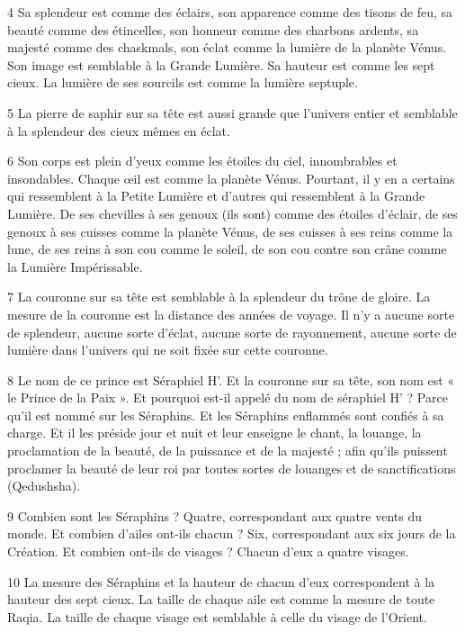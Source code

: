 \par 4 Sa splendeur est comme des éclairs, son apparence comme des tisons de feu, sa beauté comme des étincelles, son honneur comme des charbons ardents, sa majesté comme des chaskmals, son éclat comme la lumière de la planète Vénus. Son image est semblable à la Grande Lumière. Sa hauteur est comme les sept cieux. La lumière de ses sourcils est comme la lumière septuple.

\par 5 La pierre de saphir sur sa tête est aussi grande que l'univers entier et semblable à la splendeur des cieux mêmes en éclat.

\par 6 Son corps est plein d'yeux comme les étoiles du ciel, innombrables et insondables. Chaque œil est comme la planète Vénus. Pourtant, il y en a certains qui ressemblent à la Petite Lumière et d’autres qui ressemblent à la Grande Lumière. De ses chevilles à ses genoux (ils sont) comme des étoiles d'éclair, de ses genoux à ses cuisses comme la planète Vénus, de ses cuisses à ses reins comme la lune, de ses reins à son cou comme le soleil, de son cou contre son crâne comme la Lumière Impérissable.

\par 7 La couronne sur sa tête est semblable à la splendeur du trône de gloire. La mesure de la couronne est la distance des années de voyage. Il n’y a aucune sorte de splendeur, aucune sorte d’éclat, aucune sorte de rayonnement, aucune sorte de lumière dans l’univers qui ne soit fixée sur cette couronne.

\par 8 Le nom de ce prince est Séraphiel H'. Et la couronne sur sa tête, son nom est « le Prince de la Paix ». Et pourquoi est-il appelé du nom de séraphiel H' ? Parce qu'il est nommé sur les Séraphins. Et les Séraphins enflammés sont confiés à sa charge. Et il les préside jour et nuit et leur enseigne le chant, la louange, la proclamation de la beauté, de la puissance et de la majesté ; afin qu'ils puissent proclamer la beauté de leur roi par toutes sortes de louanges et de sanctifications (Qedushsha).

\par 9 Combien sont les Séraphins ? Quatre, correspondant aux quatre vents du monde. Et combien d’ailes ont-ils chacun ? Six, correspondant aux six jours de la Création. Et combien ont-ils de visages ? Chacun d’eux a quatre visages.

\par 10 La mesure des Séraphins et la hauteur de chacun d'eux correspondent à la hauteur des sept cieux. La taille de chaque aile est comme la mesure de toute Raqia. La taille de chaque visage est semblable à celle du visage de l’Orient.

